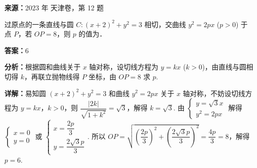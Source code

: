 \begin{question}[points=5]
\textbf{来源：}2023 年 天津卷，第 12 题\par
过原点的一条直线与圆 $C: (x+2)^2 + y^2 = 3$ 相切，交曲线 $y^2 = 2px$ ($p > 0$) 于点 $P$，若 $OP = 8$，则 $p$ 的值为．
\fillin[{$6$}]
\begin{solution}
\textbf{答案：}$6$

\textbf{分析：}根据圆和曲线关于 $x$ 轴对称，设切线方程为 $y = kx$ ($k>0$)，由直线与圆相切得 $k$，再联立抛物线得 $P$ 坐标，由 $OP=8$ 求 $p$.

\textbf{详解：}易知圆 $(x+2)^2 + y^2 = 3$ 和曲线 $y^2 = 2px$ 关于 $x$ 轴对称，不妨设切线方程为 $y = kx$，$k > 0$，则 $\dfrac{|2k|}{\sqrt{1+k^2}} = \sqrt{3}$，解得 $k = \sqrt{3}$. 由 $\begin{cases} y = \sqrt{3}x \\ y^2 = 2px \end{cases}$ 解得 $\begin{cases} x = 0 \\ y = 0 \end{cases}$ 或 $\begin{cases} x = \dfrac{2p}{3} \\ y = \dfrac{2\sqrt{3}p}{3} \end{cases}$. 所以 $OP = \sqrt{\left(\dfrac{2p}{3}\right)^2 + \left(\dfrac{2\sqrt{3}p}{3}\right)^2} = \dfrac{4p}{3} = 8$，解得 $p=6$.
\end{solution}
\end{question}

